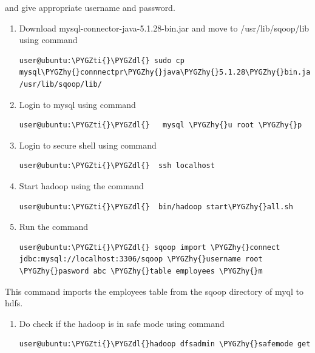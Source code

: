 \documentclass[a4paper,12pt,oneside]{sphinxmanual}
\def\PYGZdl{\char`\$}
\def\PYGZhy{\char`\-}
\def\PYGZti{\char`\~}
\begin{document}
and give appropriate username and password.
\begin{enumerate}
\item {} 
Download mysql-connector-java-5.1.28-bin.jar and move to /usr/lib/sqoop/lib using command

\begin{Verbatim}[commandchars=\\\{\}]
user@ubuntu:\PYGZti{}\PYGZdl{} sudo cp mysql\PYGZhy{}connnectpr\PYGZhy{}java\PYGZhy{}5.1.28\PYGZhy{}bin.jar
/usr/lib/sqoop/lib/
\end{Verbatim}

\item {} 
Login to mysql using command

\begin{Verbatim}[commandchars=\\\{\}]
user@ubuntu:\PYGZti{}\PYGZdl{}   mysql \PYGZhy{}u root \PYGZhy{}p
\end{Verbatim}

\item {} 
Login to secure shell using command

\begin{Verbatim}[commandchars=\\\{\}]
user@ubuntu:\PYGZti{}\PYGZdl{}  ssh localhost
\end{Verbatim}

\item {} 
Start hadoop using the command

\begin{Verbatim}[commandchars=\\\{\}]
user@ubuntu:\PYGZti{}\PYGZdl{}  bin/hadoop start\PYGZhy{}all.sh
\end{Verbatim}

\item {} 
Run the command

\begin{Verbatim}[commandchars=\\\{\}]
user@ubuntu:\PYGZti{}\PYGZdl{} sqoop import \PYGZhy{}connect
jdbc:mysql://localhost:3306/sqoop \PYGZhy{}username root
\PYGZhy{}pasword abc \PYGZhy{}table employees \PYGZhy{}m
\end{Verbatim}

\end{enumerate}

This command imports the employees table from the sqoop directory of myql to hdfs.
\begin{enumerate}
\item {} 
Do check if the hadoop is in safe mode using command

\begin{Verbatim}[commandchars=\\\{\}]
user@ubuntu:\PYGZti{}\PYGZdl{}hadoop dfsadmin \PYGZhy{}safemode get
\end{Verbatim}

\end{enumerate}
\end{document}
